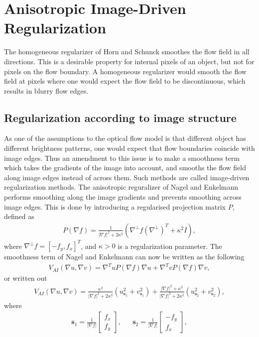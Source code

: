 \chapter{Anisotropic Image-Driven Regularization}
The homogeneous regularizer of Horn and Schunck smoothes the flow field in all directions. This is a desirable property for internal pixels of an object, but not for pixels on the flow boundary. A homogeneous regularizer would smooth the flow field at pixels where one would expect the flow field to be discontinuous, which results in blurry flow edges. 
\section{Regularization according to image structure}
As one of the assumptions to the optical flow model is that different object has different brightness patterns, one would expect that flow boundaries coincide with image edges. Thus an amendment to this issue is to make a smoothness term which takes the gradients of the image into account, and smooths the flow field along image edges instead of across them. Such methods are called image-driven regularization methods. The anisotropic reguralizer of Nagel and Enkelmann \cite{Nagel:1986:ISC:11284.11285} performs smoothing along the image gradients and prevents smoothing across image edges. This is done by introducing a regularised projection matrix $P$, defined as
\begin{align*}
P(\nabla f) = \frac{1}{|\nabla f|^2 + 2 \kappa^2} (\nabla^{\bot} f (\nabla^{\bot})^T + \kappa^2 I),
\end{align*}
where $\nabla^{\bot} f= \left[-f_y, f_x \right]^T$, and $\kappa > 0$ is a regularization parameter. The smoothness term of Nagel and Enkelmann can now be written as the following
\begin{align*}
V_{AI}(\nabla u, \nabla v) = \nabla ^T u P(\nabla f) \nabla u + \nabla ^T v P(\nabla f) \nabla v,
\end{align*}
or written out 
\begin{align*}
V_{AI}(\nabla u, \nabla v) = \frac{\kappa^2}{|\nabla f|^2 + 2 \kappa^2} \left( u_{\textbf{s}_1}^2 + v_{\textbf{s}_1}^2 \right) + \frac{|\nabla f|^2 + \kappa^2}{|\nabla f|^2 + 2 \kappa^2} \left(u_{\textbf{s}_2}^2 + v_{\textbf{s}_2}^2 \right),
\end{align*}
where 
\begin{align}
\label{ID_smoothingDir}
&\textbf{s}_1 = \frac{1}{|\nabla f|}\begin{bmatrix}
f_x \\
f_y
\end{bmatrix},
& & \textbf{s}_2 = \frac{1}{|\nabla f|}\begin{bmatrix}
-f_y \\
f_x
\end{bmatrix}, & 
\end{align}
